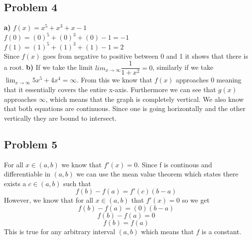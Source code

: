 \documentclass[12pt]{article}
\begin{document}
\subsection*{Problem 4}
\textbf{a) } $f(x) = x^5 + x^3 + x - 1$\\
$f(0) = (0)^5 + (0)^3 + (0) - 1 = -1$\\
$f(1) = (1)^5 + (1)^3 + (1) - 1 = 2$\\
Since $f(x)$ goes from negative to positive between 0 and 1 it shows that there is a root.
\textbf{b) } If we take the limit $lim_{x \to \infty}\dfrac{1}{1+x^2} = 0$, similarly if we take $\lim_{x \to \infty}5x^5+4x^4 = \infty$. From this we know that $f(x)$ approaches $0$ meaning that it essentially covers the entire x-axis. Furthermore we can see that $g(x)$ approaches $\infty$, which means that the graph is completely vertical. We also know that both equations are continuous. Since one is going horizontally and the other vertically they are bound to intersect.
\subsection*{Problem 5}
For all $x \in (a,b)$ we know that $f'(x) = 0$. Since f is continous and differentiable in $(a,b)$ we can use the mean value theorem which states there exists a $c \in (a,b)$ such that
\[ f(b) - f(a) = f'(c)(b-a) \]
However, we know that for all $x \in (a,b)$ that $f'(x) = 0$ so we get
\[ f(b) - f(a) = (0)(b-a) \]
\[ f(b) - f(a) = 0 \]
\[ f(b) = f(a) \]
This is true for any arbitrary interval $(a,b)$ which means that $f$ is a constant.
\end{document}
